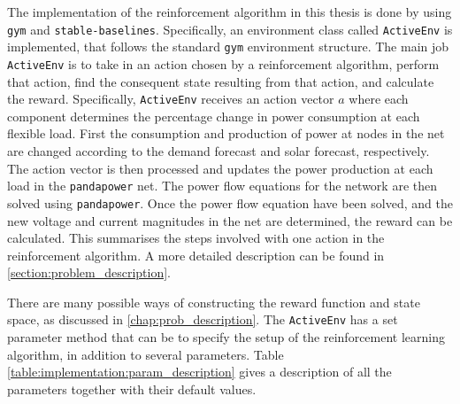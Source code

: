 \documentclass[class=book, crop=false]{standalone}
\begin{document}
The implementation of the reinforcement algorithm in this thesis is done by using \texttt{gym} and \texttt{stable-baselines}. Specifically, an environment class called \texttt{ActiveEnv} is implemented, that follows the standard \texttt{gym} environment structure. The main job \texttt{ActiveEnv} is to take in an action chosen by a reinforcement algorithm, perform that action, find the consequent state resulting from that action, and calculate the reward. Specifically, \texttt{ActiveEnv} receives an action vector $a$ where each component determines the percentage change in power consumption at each flexible load. First the consumption and production of power at nodes in the net are changed according to the demand forecast and solar forecast, respectively. The action vector is then processed and updates the power production at each load in the \texttt{pandapower} net. The power flow equations for the network are then solved using \texttt{pandapower}. Once the power flow equation have been solved, and the new voltage and current magnitudes in the net are determined, the reward can be calculated. This summarises the steps involved with one action in the reinforcement algorithm. A more detailed description can be found in \ref{section:problem_description}.   

There are many possible ways of constructing the reward function and state space, as discussed in \ref{chap:prob_description}. The \texttt{ActiveEnv} has a set parameter method that can be to specify the setup of the reinforcement learning algorithm, in addition to several parameters. Table \ref{table:implementation:param_description} gives a description of all the parameters together with their default values.  
\end{document}
